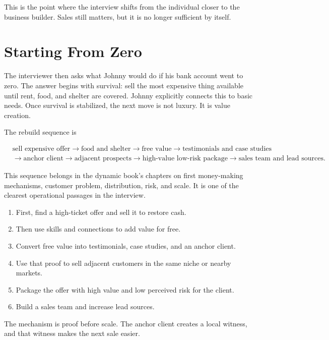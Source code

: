 This is the point where the interview shifts from the individual closer to the business builder. Sales still matters, but it is no longer sufficient by itself.

\section{Starting From Zero}

The interviewer then asks what Johnny would do if his bank account went to zero. The answer begins with survival: sell the most expensive thing available until rent, food, and shelter are covered. Johnny explicitly connects this to basic needs. Once survival is stabilized, the next move is not luxury. It is value creation.

The rebuild sequence is

\begin{equation}
\begin{aligned}
&\text{sell expensive offer}
\rightarrow
\text{food and shelter}
\rightarrow
\text{free value}
\rightarrow
\text{testimonials and case studies}\\
&\rightarrow
\text{anchor client}
\rightarrow
\text{adjacent prospects}
\rightarrow
\text{high-value low-risk package}
\rightarrow
\text{sales team and lead sources}.
\end{aligned}
\end{equation}

This sequence belongs in the dynamic book's chapters on first money-making mechanisms, customer problem, distribution, risk, and scale. It is one of the clearest operational passages in the interview.

\begin{enumerate}
\item First, find a high-ticket offer and sell it to restore cash.
\item Then use skills and connections to add value for free.
\item Convert free value into testimonials, case studies, and an anchor client.
\item Use that proof to sell adjacent customers in the same niche or nearby markets.
\item Package the offer with high value and low perceived risk for the client.
\item Build a sales team and increase lead sources.
\end{enumerate}

The mechanism is proof before scale. The anchor client creates a local witness, and that witness makes the next sale easier.

